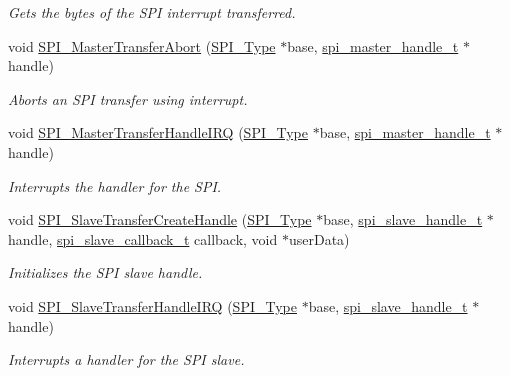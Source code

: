 \begin{DoxyCompactItemize}
\begin{DoxyCompactList}\small\item\em Gets the bytes of the S\+PI interrupt transferred. \end{DoxyCompactList}\item 
void \mbox{\hyperlink{group__spi__driver_gae90962a54978acf05ca7780489301eb4}{S\+P\+I\+\_\+\+Master\+Transfer\+Abort}} (\mbox{\hyperlink{struct_s_p_i___type}{S\+P\+I\+\_\+\+Type}} $\ast$base, \mbox{\hyperlink{struct__spi__master__handle}{spi\+\_\+master\+\_\+handle\+\_\+t}} $\ast$handle)
\begin{DoxyCompactList}\small\item\em Aborts an S\+PI transfer using interrupt. \end{DoxyCompactList}\item 
void \mbox{\hyperlink{group__spi__driver_ga645d041a92bde312d6cf64517c618c41}{S\+P\+I\+\_\+\+Master\+Transfer\+Handle\+I\+RQ}} (\mbox{\hyperlink{struct_s_p_i___type}{S\+P\+I\+\_\+\+Type}} $\ast$base, \mbox{\hyperlink{struct__spi__master__handle}{spi\+\_\+master\+\_\+handle\+\_\+t}} $\ast$handle)
\begin{DoxyCompactList}\small\item\em Interrupts the handler for the S\+PI. \end{DoxyCompactList}\item 
void \mbox{\hyperlink{group__spi__driver_gab7e0ae7d0a88e7e1059b2cb0ed878b2e}{S\+P\+I\+\_\+\+Slave\+Transfer\+Create\+Handle}} (\mbox{\hyperlink{struct_s_p_i___type}{S\+P\+I\+\_\+\+Type}} $\ast$base, \mbox{\hyperlink{group__spi__driver_gad267cfee3a876b2860217ff94f03f574}{spi\+\_\+slave\+\_\+handle\+\_\+t}} $\ast$handle, \mbox{\hyperlink{group__spi__driver_ga13fbc3110c56c1d312e4a5ebed07d679}{spi\+\_\+slave\+\_\+callback\+\_\+t}} callback, void $\ast$user\+Data)
\begin{DoxyCompactList}\small\item\em Initializes the S\+PI slave handle. \end{DoxyCompactList}\item 
void \mbox{\hyperlink{group__spi__driver_gaac1ff8fc728c925d78b1237949ebf7c3}{S\+P\+I\+\_\+\+Slave\+Transfer\+Handle\+I\+RQ}} (\mbox{\hyperlink{struct_s_p_i___type}{S\+P\+I\+\_\+\+Type}} $\ast$base, \mbox{\hyperlink{group__spi__driver_gad267cfee3a876b2860217ff94f03f574}{spi\+\_\+slave\+\_\+handle\+\_\+t}} $\ast$handle)
\begin{DoxyCompactList}\small\item\em Interrupts a handler for the S\+PI slave. \end{DoxyCompactList}\end{DoxyCompactItemize}


